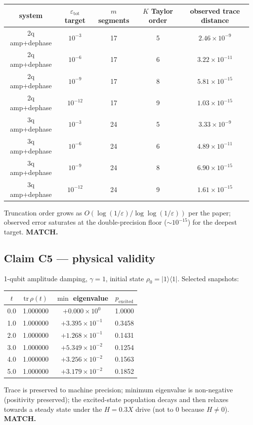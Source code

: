 \documentclass[11pt]{article}
\begin{document}
\begin{center}
\begin{tabular}{ccccc}
\toprule
system & $\varepsilon_{\text{tot}}$ target & $m$ segments & $K$ Taylor order & observed trace distance \\
\midrule
2q amp+dephase & $10^{-3}$  & 17 & 5 & $2.46{\times}10^{-9}$ \\
2q amp+dephase & $10^{-6}$  & 17 & 6 & $3.22{\times}10^{-11}$ \\
2q amp+dephase & $10^{-9}$  & 17 & 8 & $5.81{\times}10^{-15}$ \\
2q amp+dephase & $10^{-12}$ & 17 & 9 & $1.03{\times}10^{-15}$ \\
3q amp+dephase & $10^{-3}$  & 24 & 5 & $3.33{\times}10^{-9}$ \\
3q amp+dephase & $10^{-6}$  & 24 & 6 & $4.89{\times}10^{-11}$ \\
3q amp+dephase & $10^{-9}$  & 24 & 8 & $6.90{\times}10^{-15}$ \\
3q amp+dephase & $10^{-12}$ & 24 & 9 & $1.61{\times}10^{-15}$ \\
\bottomrule
\end{tabular}
\end{center}
Truncation order grows as $O(\log(1/\varepsilon)/\log\log(1/\varepsilon))$ per the paper; observed error saturates at the double-precision floor ($\sim 10^{-15}$) for the deepest target. \textbf{MATCH.}

\subsection{Claim C5 --- physical validity}

1-qubit amplitude damping, $\gamma = 1$, initial state $\rho_0 = \lvert 1\rangle\langle 1\rvert$. Selected snapshots:

\begin{center}
\begin{tabular}{cccc}
\toprule
$t$ & $\mathrm{tr}\,\rho(t)$ & $\min$ eigenvalue & $p_{\text{excited}}$ \\
\midrule
0.0 & 1.000000 & $+0.000{\times}10^0$   & 1.0000 \\
1.0 & 1.000000 & $+3.395{\times}10^{-1}$ & 0.3458 \\
2.0 & 1.000000 & $+1.268{\times}10^{-1}$ & 0.1431 \\
3.0 & 1.000000 & $+5.349{\times}10^{-2}$ & 0.1254 \\
4.0 & 1.000000 & $+3.256{\times}10^{-2}$ & 0.1563 \\
5.0 & 1.000000 & $+3.179{\times}10^{-2}$ & 0.1852 \\
\bottomrule
\end{tabular}
\end{center}
Trace is preserved to machine precision; minimum eigenvalue is non-negative (positivity preserved); the excited-state population decays and then relaxes towards a steady state under the $H = 0.3 X$ drive (not to $0$ because $H \neq 0$).  \textbf{MATCH.}
\end{document}

